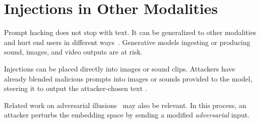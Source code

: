 \section{Injections in Other Modalities}
\label{appx:other-modalities}

Prompt hacking does not stop with text. It can be generalized to other modalities and hurt end users in different ways~\cite{schlarmann2023adversarial}. Generative models ingesting or producing sound, images, and video outputs are at risk.

Injections can be placed directly into images or sound clips. Attackers have already blended malicious prompts into images or sounds provided to the model, steering it to output the attacker-chosen text \cite{bagdasaryan2023ab,fumisusing,qi2023visual,carlini2023aligned}.

Related work on adversarial illusions~\cite{zhou2023advclip,shayegani2023plug,bagdasaryan2023ceci} may also be relevant. In this process, an attacker perturbs the embedding space by sending a modified \textit{adversarial} input.



